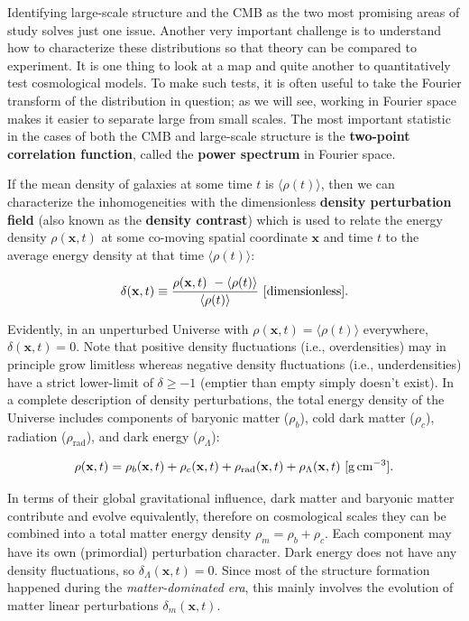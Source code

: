 \documentclass[a4paper,11pt]{article}
\begin{document}
{\noindent}Identifying large-scale structure and the CMB as the two most promising areas of study solves just one issue. Another very important challenge is to understand how to characterize these distributions so that theory can be compared to experiment. It is one thing to look at a map and quite another to quantitatively test cosmological models. To make such tests, it is often useful to take the Fourier transform of the distribution in question; as we will see, working in Fourier space makes it easier to separate large from small scales. The most important statistic in the cases of both the CMB and large-scale structure is the \textbf{two-point correlation function}, called the \textbf{power spectrum} in Fourier space.

{\noindent}If the mean density of galaxies at some time $t$ is $\langle\rho(t)\rangle$, then we can characterize the inhomogeneities with the dimensionless \textbf{density perturbation field} (also known as the \textbf{density contrast}) which is used to relate the energy density $\rho(\mathbf{x},t)$ at some co-moving spatial coordinate $\mathbf{x}$ and time $t$ to the average energy density at that time $\langle\rho(t)\rangle$:

\begin{align*}
    \delta(\mathbf{x},t) \equiv \frac{\rho(\mathbf{x},t)~- \langle\rho(t)\rangle}{\langle\rho(t)\rangle} ~ [{\rm dimensionless}].
\end{align*}

{\noindent}Evidently, in an unperturbed Universe with $\rho(\mathbf{x},t) = \langle\rho(t)\rangle$ everywhere, $\delta(\mathbf{x},t) = 0$. Note that positive density fluctuations (i.e., overdensities) may in principle grow limitless whereas negative density fluctuations (i.e., underdensities) have a strict lower-limit of $\delta \geq -1$ (emptier than empty simply doesn't exist). In a complete description of density perturbations, the total energy density of the Universe includes components of baryonic matter ($\rho_b$), cold dark matter ($\rho_c$), radiation ($\rho_\mathrm{rad}$), and dark energy ($\rho_\Lambda$):

\begin{align*}
    \rho(\mathbf{x},t) = \rho_b(\mathbf{x},t) + \rho_c(\mathbf{x},t) + \rho_\mathrm{rad}(\mathbf{x},t) + \rho_\Lambda(\mathbf{x},t) ~ [{\rm g\,cm^{-3}}].
\end{align*}

{\noindent}In terms of their global gravitational influence, dark matter and baryonic matter contribute and evolve equivalently, therefore on cosmological scales they can be combined into a total matter energy density $\rho_m = \rho_b + \rho_c$. Each component may have its own (primordial) perturbation character. Dark energy does not have any density fluctuations, so $\delta_\Lambda(\mathbf{x},t) = 0$. Since most of the structure formation happened during the \textit{matter-dominated era}, this mainly involves the evolution of matter linear perturbations $\delta_m(\mathbf{x},t)$.
\end{document}
